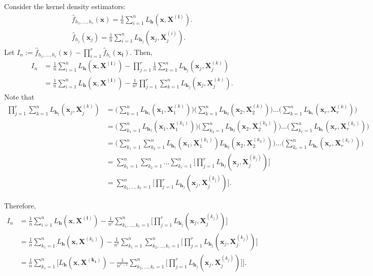 \documentclass{article}
\begin{document}
Consider the kernel density estimators:
\begin{align}
    \hat{f}_{h_1, \dots, h_r}(\mathbf{x}) = \frac{1}{n} \sum_{i=1}^{n} L_{\mathbf{h}}(\mathbf{x},\mathbf{X^{(i)}}). \\
    \hat{f}_{h_j}(\mathbf{x}_j) = \frac{1}{n} \sum_{i=1}^{n} L_{\mathbf{h}_j}(\mathbf{x}_j,\mathbf{X}_j^{(i)}).
\end{align}
Let $I_n := \hat{f}_{h_1, \dots, h_r}(\mathbf{x}) - \prod_{i = 1}^{r} \hat{f}_{h_i}(\mathbf{x_i})$. Then,
\begin{align}
    I_n &= \frac{1}{n} \sum_{i=1}^{n} L_{\mathbf{h}}(\mathbf{x},\mathbf{X^{(i)}}) - \prod_{j=1}^{r} \frac{1}{n} \sum_{k=1}^{n} L_{\mathbf{h}_j}(\mathbf{x}_j,\mathbf{X}_j^{(k)}) \\
    &= \frac{1}{n} \sum_{i=1}^{n} L_{\mathbf{h}}(\mathbf{x},\mathbf{X^{(i)}}) - \frac{1}{n^r} \prod_{j=1}^{r} \sum_{k=1}^{n} L_{\mathbf{h}_j}(\mathbf{x}_j,\mathbf{X}_j^{(k)}).
\end{align}
Note that
\begin{align}
    \prod_{j=1}^{r} \sum_{k=1}^{n} L_{\mathbf{h}_j}(\mathbf{x}_j,\mathbf{X}_j^{(k)}) &= \Big( \sum_{k=1}^{n} L_{\mathbf{h}_1}(\mathbf{x}_1,\mathbf{X}_1^{(k)}) \Big) \Big( \sum_{k=1}^{n} L_{\mathbf{h}_2}(\mathbf{x}_2,\mathbf{X}_2^{(k)}) \Big) \dots \Big( \sum_{k=1}^{n} L_{\mathbf{h}_r}(\mathbf{x}_r,\mathbf{X}_r^{(k)}) \Big) \\
    &= \Big( \sum_{k_1=1}^{n} L_{\mathbf{h}_1}(\mathbf{x}_1,\mathbf{X}_1^{(k_1)}) \Big) \Big( \sum_{k_2=1}^{n} L_{\mathbf{h}_2}(\mathbf{x}_2,\mathbf{X}_2^{(k_2)}) \Big) \dots \Big( \sum_{k_r=1}^{n} L_{\mathbf{h}_r}(\mathbf{x}_r,\mathbf{X}_r^{(k_r)}) \Big) \\
    &= \Big( \sum_{k_1=1}^{n} \sum_{k_2=1}^{n} L_{\mathbf{h}_1}(\mathbf{x}_1,\mathbf{X}_1^{(k_1)}) L_{\mathbf{h}_2}(\mathbf{x}_2,\mathbf{X}_2^{(k_2)}) \Big) \dots \Big( \sum_{k_r=1}^{n} L_{\mathbf{h}_r}(\mathbf{x}_r,\mathbf{X}_r^{(k_r)}) \Big) \\
    &= \sum_{k_1=1}^{n} \sum_{k_2=1}^{n} \dots \sum_{k_r=1}^{n} \Big[ \prod_{j=1}^{r} L_{\mathbf{h}_j}(\mathbf{x}_j,\mathbf{X}_j^{(k_j)}) \Big] \\
    &= \sum_{k_1, \dots, k_r =1}^{n} \Big[ \prod_{j=1}^{r} L_{\mathbf{h}_j}(\mathbf{x}_j,\mathbf{X}_j^{(k_j)}) \Big].
\end{align}

Therefore,
\begin{align}
    I_n &= \frac{1}{n} \sum_{i=1}^{n} L_{\mathbf{h}}(\mathbf{x},\mathbf{X^{(i)}}) - \frac{1}{n^r} \sum_{k_1, \dots, k_r =1}^{n} \Big[ \prod_{j=1}^{r} L_{\mathbf{h}_j}(\mathbf{x}_j,\mathbf{X}_j^{(k_j)}) \Big] \\
    &= \frac{1}{n} \sum_{k_1=1}^{n} L_{\mathbf{h}}(\mathbf{x},\mathbf{X}^{(k_1)}) - \frac{1}{n^r} \sum_{k_1=1}^{n} \sum_{k_2, \dots, k_r =1}^{n} \Big[ \prod_{j=1}^{r} L_{\mathbf{h}_j}(\mathbf{x}_j,\mathbf{X}_j^{(k_j)}) \Big] \\
    &= \frac{1}{n} \sum_{k_1=1}^{n} \Big[ L_{\mathbf{h}}(\mathbf{x},\mathbf{X^{(k_1)}}) - \frac{1}{n^{r-1}} \sum_{k_2, \dots, k_r =1}^{n} \Big[ \prod_{j=1}^{r} L_{\mathbf{h}_j}(\mathbf{x}_j,\mathbf{X}_j^{(k_j)}) \Big] \Big]. \label{eq:avg-dif}
\end{align}
\end{document}
